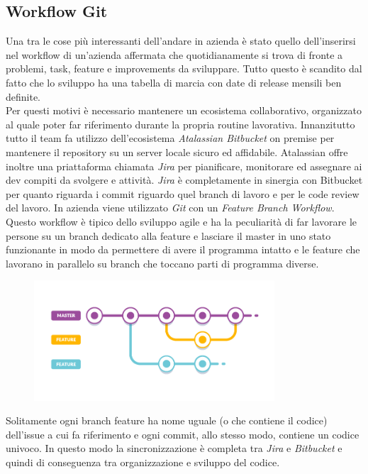 \documentclass[a4paper]{article}
\begin{document}
\subsection{Workflow Git}
\par Una tra le cose più interessanti dell'andare in azienda è stato quello dell'inserirsi
nel workflow di un'azienda affermata che quotidianamente si trova di fronte a problemi,
task, feature e improvements da sviluppare. Tutto questo è scandito dal fatto che lo sviluppo
ha una tabella di marcia con date di release mensili ben definite.\\
Per questi motivi è necessario mantenere un ecosistema collaborativo, organizzato
al quale poter far riferimento durante la propria routine lavorativa.
Innanzitutto tutto il team fa utilizzo dell'ecosistema \emph{Atalassian Bitbucket}
on premise per mantenere il repository su un server locale sicuro ed affidabile.
Atalassian offre inoltre una priattaforma chiamata \emph{Jira} per pianificare, monitorare ed assegnare
ai dev compiti da svolgere e attività. \emph{Jira} è completamente in sinergia con
Bitbucket per quanto riguarda i commit riguardo quel branch di lavoro e per le code review 
del lavoro.
In azienda viene utilizzato \emph{Git} con un \emph{Feature Branch Workflow}.
Questo workflow è tipico dello sviluppo agile e ha la peculiarità di far lavorare
le persone su un branch dedicato alla feature e lasciare il master in uno stato funzionante
in modo da permettere di avere il programma intatto e le feature che lavorano in parallelo 
su branch che toccano parti di programma diverse.
\begin{figure}[H]
	\includegraphics[width=0.8\textwidth]{feature-branch.png}
	\centering
\end{figure}
Solitamente ogni branch feature ha nome uguale (o che contiene il codice) dell'issue
a cui fa riferimento e ogni commit, allo stesso modo, contiene un codice univoco.
In questo modo la sincronizzazione è completa tra \emph{Jira} e \emph{Bitbucket} e quindi
di conseguenza tra organizzazione e sviluppo del codice.
\end{document}

